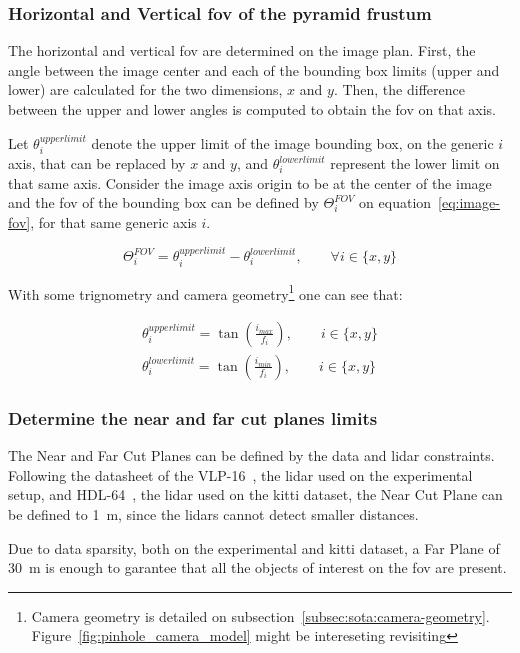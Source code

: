 \subsubsection{Horizontal and Vertical \ac{fov} of the pyramid frustum}
The horizontal and vertical \ac{fov} are determined on the image plan. First, the angle between the image center and each of the bounding box limits (upper and lower) are calculated for the two dimensions, $x$ and $y$. Then, the difference between the upper and lower angles is computed to obtain the \ac{fov} on that axis.

Let $\theta^{upper limit}_i$ denote the upper limit of the image bounding box, on the generic $i$ axis, that can be replaced by $x$ and $y$, and $\theta^{lower limit}_i$ represent the lower limit on that same axis. Consider the image axis origin to be at the center of the image and the \ac{fov} of the bounding box can be defined by $\Theta^{FOV}_i$ on equation~\ref{eq:image-fov}, for that same generic axis $i$.

\begin{equation}
	\label{eq:image-fov}
	\Theta^{FOV}_i = \theta^{upper limit}_i - \theta^{lower limit}_i, \qquad \forall i \in \{x, y\}
\end{equation}

With some trignometry and camera geometry\footnote{Camera geometry is detailed on subsection~\ref{subsec:sota:camera-geometry}. Figure~\ref{fig:pinhole_camera_model} might be intereseting revisiting} one can see that:

\begin{align}
	\theta^{upper limit}_i = \tan\left(\frac{i_{max}}{f_i}\right), \qquad i \in \{x, y\} \\
	\theta^{lower limit}_i = \tan\left(\frac{i_{min}}{f_i}\right), \qquad i \in \{x, y\} 
\end{align}

\subsubsection{Determine the near and far cut planes limits}
The Near and Far Cut Planes can be defined by the data and \ac{lidar} constraints. Following the datasheet of the VLP-16~\cite{vlp16}, the \ac{lidar} used on the experimental setup, and HDL-64~\cite{VelodyneHDL64}, the \ac{lidar} used on the \ac{kitti} dataset, the Near Cut Plane can be defined to \SI{1}{\meter}, since the \acp{lidar} cannot detect smaller distances.

Due to data sparsity, both on the experimental and  \ac{kitti} dataset, a Far Plane of \SI{30}{\meter} is enough to garantee that all the objects of interest on the \ac{fov} are present.

